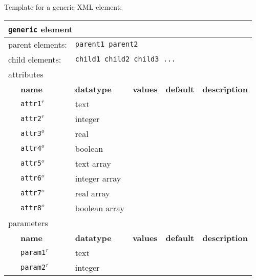 Template for a generic XML element:
\FloatBarrier
\begin{table}[h]
\begin{center}
\begin{tabularx}{\textwidth}{l l l l l X }
\hline
\multicolumn{6}{l}{\texttt{generic} element} \\
\hline
\multicolumn{2}{l}{parent elements:} & \multicolumn{4}{l}{\texttt{parent1 parent2}}\\
\multicolumn{2}{l}{child  elements:} & \multicolumn{4}{l}{\texttt{child1 child2 child3 ...}}\\
\multicolumn{2}{l}{attributes}  & \multicolumn{4}{l}{}\\
   &   \bfseries name     & \bfseries datatype & \bfseries values & \bfseries default   & \bfseries description \\
   &   \texttt{attr1}$^r$ &  text              &                  &                     &                       \\
   &   \texttt{attr2}$^r$ &  integer           &                  &                     &                       \\
   &   \texttt{attr3}$^o$ &  real              &                  &                     &                       \\
   &   \texttt{attr4}$^o$ &  boolean           &                  &                     &                       \\
   &   \texttt{attr5}$^o$ &  text array        &                  &                     &                       \\
   &   \texttt{attr6}$^o$ &  integer array     &                  &                     &                       \\
   &   \texttt{attr7}$^o$ &  real array        &                  &                     &                       \\
   &   \texttt{attr8}$^o$ &  boolean array     &                  &                     &                       \\
\multicolumn{2}{l}{parameters}  & \multicolumn{4}{l}{}\\
   &   \bfseries name     & \bfseries datatype & \bfseries values & \bfseries default   & \bfseries description \\
   &   \texttt{param1}$^r$&  text              &                  &                     &                       \\
   &   \texttt{param2}$^r$&  integer           &                  &                     &                       \\

\end{tabularx}
\end{center}
\end{table}
